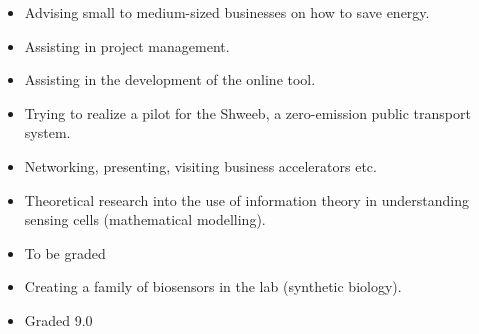 \documentclass[10pt,a4paper,ragged2e]{altacv}
\begin{document}
\divider

\begin{itemize}
\item Advising small to medium-sized businesses on how to save energy. 
\item Assisting in project management.
\item Assisting in the development of the online tool. 
\end{itemize}


\divider

\begin{itemize}
\item Trying to realize a pilot for the Shweeb, a zero-emission public transport system.
\item Networking, presenting, visiting business accelerators etc.
\end{itemize}




\begin{itemize}
\item Theoretical research into the use of information theory in understanding sensing cells (mathematical modelling).
\item To be graded
\end{itemize}

\divider

\begin{itemize}
\item Creating a family of biosensors in the lab (synthetic biology).
\item Graded 9.0
\end{itemize}
\end{document}
